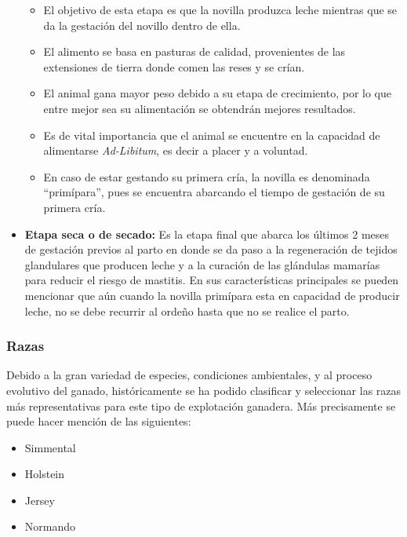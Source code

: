 \begin{itemize}
\begin{itemize}
		\item El objetivo de esta etapa es que la novilla produzca leche mientras que se da la gestación del novillo dentro de ella.
		\item El alimento se basa en pasturas de calidad, provenientes de las extensiones de tierra donde comen las reses y se crían.
		\item El animal gana mayor peso debido a su etapa de crecimiento, por lo que entre mejor sea su alimentación se obtendrán mejores resultados.
		\item Es de vital importancia que el animal se encuentre en la capacidad de  alimentarse \textit{Ad-Libitum}, es decir a placer y a voluntad.
		\item En caso de estar gestando su primera cría, la novilla es denominada ``primípara'', pues se encuentra abarcando el tiempo de gestación de su primera cría.\\
	\end{itemize} 
    \item \textbf{Etapa seca o de secado:} Es la etapa final que abarca los últimos 2 meses de gestación previos al parto en donde se da paso a la regeneración de tejidos glandulares que producen leche y a la curación de las glándulas mamarías para reducir el riesgo de mastitis. En sus características principales se pueden mencionar que aún cuando la novilla primípara esta en capacidad de producir leche, no se debe recurrir al ordeño hasta que no se realice el parto.
\end{itemize} 

\subsubsection{Razas}

Debido a la gran variedad de especies, condiciones ambientales, y al proceso evolutivo del ganado, históricamente se ha podido clasificar y seleccionar las razas más representativas para este tipo de explotación ganadera. Más precisamente se puede hacer mención de las siguientes:
\begin{multicols}{2}
    \begin{center}
        \begin{itemize}
        \item Simmental
        \item Holstein
        \item Jersey
        \item Normando
        \end{itemize}
    \end{center}
\end{multicols}

